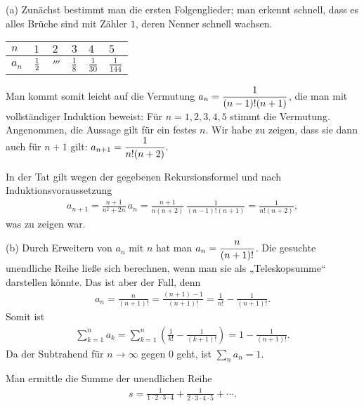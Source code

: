 \documentclass[11pt,a4paper]{article}
\begin{document}
\begin{loesung}
(a) Zunächst bestimmt man die ersten Folgenglieder; man erkennt schnell, dass
  es alles Brüche sind mit Zähler $1$, deren Nenner schnell wachsen.
\begin{center}
\begin{tabular}{l||lllll}
$n$ & $1$ & $2$ & $3$ & $4 $ & $5$\\  \hline
$a_n$ & $\frac{1}{2} $ & $\third $ & $\frac{1}{8} $ & $\frac{1}{30} $ & 
$\frac{1}{144}$ 
\end{tabular}
\end{center}

Man kommt somit leicht auf die Vermutung $\displaystyle a_n=\frac{1}{(n-1)! (n+1)}$, die
man mit vollständiger Induktion beweist: Für $n=1,2,3,4,5$ stimmt die
Vermutung. Angenommen, die Aussage gilt für ein festes $n$. Wir habe zu zeigen,
dass sie dann auch für $n+1$ gilt: $\displaystyle a_{n+1}= \frac{1}{n! (n+2)}.$

In der Tat gilt wegen der gegebenen Rekursionsformel und nach
Induktionsvoraussetzung
\begin{gather*}
a_{n+1}= \frac{n+1}{n^2 +2n} \,a_{n} = \frac{n+1}{n(n+2)} \, \frac{1}{(n-1)!
  (n+1)}=\frac{1}{n! (n+2)},
\end{gather*}
was zu zeigen war.

(b) Durch Erweitern von $a_n $ mit $n$ hat man $\displaystyle a_n=\frac{n}{(n+1)!}$. Die
gesuchte unendliche Reihe ließe sich berechnen, wenn man sie als
„Teleskopsumme“ darstellen könnte. Das ist aber der Fall, denn
\begin{gather*}
a_n=\frac{n}{(n+1)!} = \frac{(n+1) -1 }{(n+1)!} =\frac{1}{n!}
-\frac{1}{(n+1)!}.
\end{gather*} 
Somit ist
\begin{gather*}
\sum_{k=1}^n a_k=\sum_{k=1}^n\left(\frac{1}{k!} -\frac{1}{(k+1)!}\right)
=1-\frac{1}{(n+1)!}.
\end{gather*}
Da der Subtrahend für $n\to \infty $ gegen $0$ geht, ist $\sum_n a_n=1$.
\end{loesung}

\begin{aufgabe}
  Man ermittle die Summe der unendlichen Reihe
\begin{gather*}
s=\frac{1}{1\cdot 2\cdot 3\cdot 4} +\frac{1}{2\cdot 3\cdot 4\cdot 5} +\cdots.
\end{gather*}
\end{aufgabe}
\end{document}
